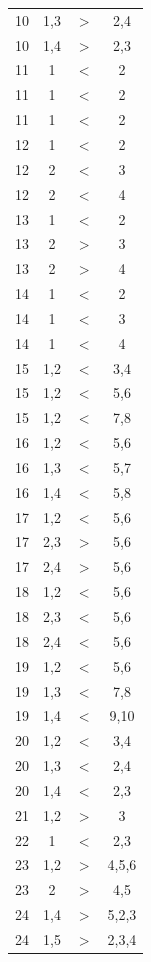 \documentclass[11pt]{article}
\begin{document}
{\begin{longtable}{cccc}
  10 & 1,3 & $>$ & 2,4 \\ 
  10 & 1,4 & $>$ & 2,3 \\ 
  \midrule
  11 & 1 & $<$ & 2 \\ 
  11 & 1 & $<$ & 2 \\ 
  11 & 1 & $<$ & 2 \\ 
  \midrule
  12 & 1 & $<$ & 2 \\ 
  12 & 2 & $<$ & 3 \\ 
  12 & 2 & $<$ & 4 \\ 
  \midrule
  13 & 1 & $<$ & 2 \\ 
  13 & 2 & $>$ & 3 \\ 
  13 & 2 & $>$ & 4 \\ 
  \midrule
  14 & 1 & $<$ & 2 \\ 
  14 & 1 & $<$ & 3 \\ 
  14 & 1 & $<$ & 4 \\ 
  \midrule
  15 & 1,2 & $<$ & 3,4 \\ 
  15 & 1,2 & $<$ & 5,6 \\ 
  15 & 1,2 & $<$ & 7,8 \\ 
  \midrule
  16 & 1,2 & $<$ & 5,6 \\ 
  16 & 1,3 & $<$ & 5,7 \\ 
  16 & 1,4 & $<$ & 5,8 \\ 
  \midrule
  17 & 1,2 & $<$ & 5,6 \\ 
  17 & 2,3 & $>$ & 5,6 \\ 
  17 & 2,4 & $>$ & 5,6 \\ 
  \midrule
  18 & 1,2 & $<$ & 5,6 \\ 
  18 & 2,3 & $<$ & 5,6 \\ 
  18 & 2,4 & $<$ & 5,6 \\ 
  \midrule
  19 & 1,2 & $<$ & 5,6 \\ 
  19 & 1,3 & $<$ & 7,8 \\ 
  19 & 1,4 & $<$ & 9,10 \\ 
  \midrule
  20 & 1,2 & $<$ & 3,4 \\ 
  20 & 1,3 & $<$ & 2,4 \\ 
  20 & 1,4 & $<$ & 2,3 \\ 
  \midrule
  21 & 1,2 & $>$ & 3 \\ 
  \midrule
  22 & 1 & $<$ & 2,3 \\ 
  \midrule
  23 & 1,2 & $>$ & 4,5,6 \\ 
  23 & 2 & $>$ & 4,5 \\ 
  \midrule
  24 & 1,4 & $>$ & 5,2,3 \\ 
  24 & 1,5 & $>$ & 2,3,4 \\ 

\end{longtable}}
\end{document}
